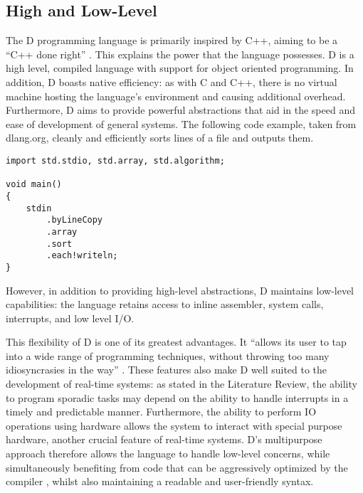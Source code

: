 \subsection{High and Low-Level}
The D programming language is primarily inspired by C++, aiming to be a ``C++ done
right'' 
\cite{qznc-tutorial}. 
This explains the power that the language possesses. D is a high level, compiled 
language with support for object oriented programming. In addition, D boasts 
native efficiency: as with C and C++, there is no virtual 
machine hosting the language's environment and causing additional overhead. 
Furthermore, D aims to provide
powerful abstractions that aid in the speed and ease of development of general systems. 
The following code example, taken from dlang.org, cleanly and efficiently 
sorts lines of a file and outputs them. 
\begin{lstlisting}[basicstyle=\small]
import std.stdio, std.array, std.algorithm;

void main()
{
    stdin
        .byLineCopy
        .array
        .sort
        .each!writeln;
}
\end{lstlisting}
However, in addition to providing high-level abstractions, D maintains low-level 
capabilities: the language retains access to inline assembler, system calls, 
interrupts, and low level I/O.
\par\bigskip\noindent
This flexibility of D is one of its greatest advantages. It ``allows its user to tap 
into a wide range of programming techniques, without throwing too many 
idiosyncrasies in the way'' \cite{ddili-book}. 
These features also make D well suited to the development of real-time systems: 
as stated in the Literature Review, the ability to program sporadic tasks
may depend on the ability to handle interrupts in a timely and predictable manner.
Furthermore, the ability to perform IO operations using hardware allows the
system to interact with special purpose hardware, another crucial feature of
real-time systems.
D's multipurpose approach therefore allows the language to handle low-level concerns,
while simultaneously benefiting from code that can be aggressively optimized by the
compiler \cite{dlang-overview}, whilst also maintaining a readable and user-friendly
syntax.


